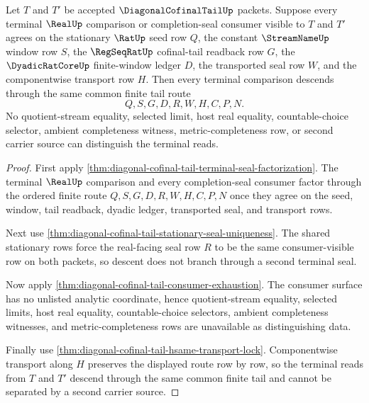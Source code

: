 \begin{theorem}
\label{thm:diagonal-cofinal-tail-terminal-common-tail-descent}
Let $T$ and $T'$ be accepted $\DiagonalCofinalTailUp$ packets. Suppose every terminal $\RealUp$ comparison or completion-seal consumer visible to $T$ and $T'$ agrees on the stationary $\RatUp$ seed row $Q$, the constant $\StreamNameUp$ window row $S$, the $\RegSeqRatUp$ cofinal-tail readback row $G$, the $\DyadicRatCoreUp$ finite-window ledger $D$, the transported seal row $W$, and the componentwise transport row $H$. Then every terminal comparison descends through the same common finite tail route
$$
Q,S,G,D,R,W,H,C,P,N.
$$
No quotient-stream equality, selected limit, host real equality, countable-choice selector, ambient completeness witness, metric-completeness row, or second carrier source can distinguish the terminal reads.
\end{theorem}
\begin{proof}
First apply \autoref{thm:diagonal-cofinal-tail-terminal-seal-factorization}. The terminal $\RealUp$ comparison and every completion-seal consumer factor through the ordered finite route $Q,S,G,D,R,W,H,C,P,N$ once they agree on the seed, window, tail readback, dyadic ledger, transported seal, and transport rows.

Next use \autoref{thm:diagonal-cofinal-tail-stationary-seal-uniqueness}. The shared stationary rows force the real-facing seal row $R$ to be the same consumer-visible row on both packets, so descent does not branch through a second terminal seal.

Now apply \autoref{thm:diagonal-cofinal-tail-consumer-exhaustion}. The consumer surface has no unlisted analytic coordinate, hence quotient-stream equality, selected limits, host real equality, countable-choice selectors, ambient completeness witnesses, and metric-completeness rows are unavailable as distinguishing data.

Finally use \autoref{thm:diagonal-cofinal-tail-hsame-transport-lock}. Componentwise transport along $H$ preserves the displayed route row by row, so the terminal reads from $T$ and $T'$ descend through the same common finite tail and cannot be separated by a second carrier source.
\end{proof}

